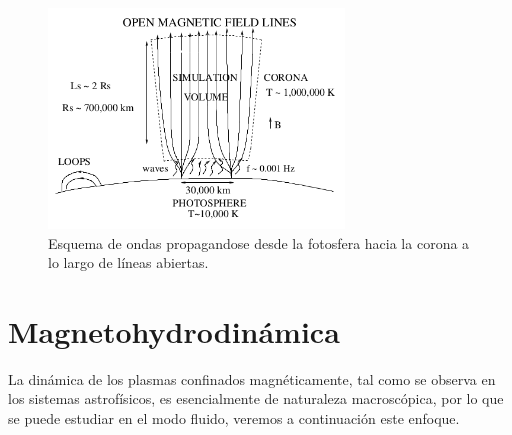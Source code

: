 \documentclass[a4paper,11pt]{report}
\begin{document}



\begin{figure}[h]
\begin{center}
\includegraphics[width=0.7\textwidth]{figuras/dmitruk.png}
\end{center}
\caption{Esquema de ondas propagandose desde la fotosfera hacia la corona a lo largo de líneas abiertas.}
\label{CH}
\end{figure}



\chapter{Magnetohydrodinámica}\label{mhd}

La dinámica de los plasmas confinados magnéticamente, tal como se observa en los sistemas astrofísicos, es esencialmente de naturaleza macroscópica, por lo que se puede estudiar en el modo fluido, veremos a continuación este enfoque. 
\end{document}
